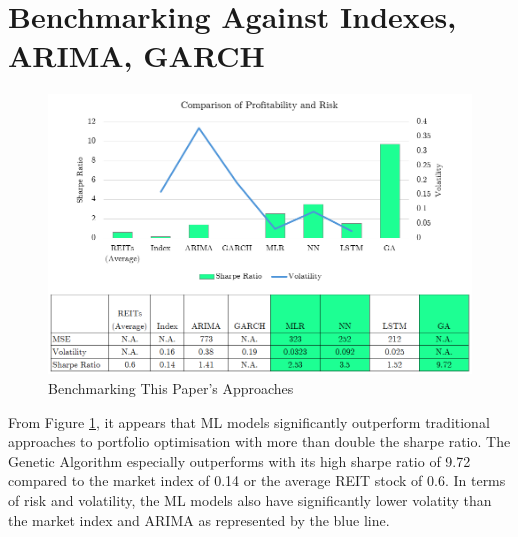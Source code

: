\documentclass[a4paper,12pt]{report}
\numberwithin{equation}{section}
\theoremstyle{definition}
\begin{document}
\section{Benchmarking Against Indexes, ARIMA, GARCH}
\begin{figure}[H]
  \centerline{\includegraphics[width=18cm]{final comparison}}
  \caption{Benchmarking This Paper's Approaches}
  \label{fig:final_comparison}
\end{figure}

From Figure \ref{fig:final_comparison}, it appears that ML models significantly outperform traditional approaches to portfolio optimisation with more than double the sharpe ratio. The Genetic Algorithm especially outperforms with its high sharpe ratio of 9.72 compared to the market index of 0.14 or the average REIT stock of 0.6. In terms of risk and volatility, the ML models also have significantly lower volatity than the market index and ARIMA as represented by the blue line.
\end{document}
